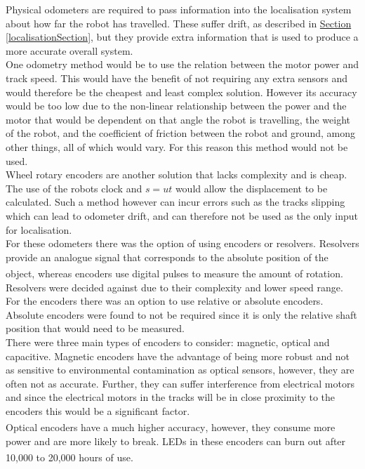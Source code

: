\documentclass[11pt]{article}		%
\newcommand{\supercite}[1]{\textsuperscript{\cite{#1}}}		%
\newcommand{\sectref}[1]{\hyperref[#1]{Section \ref*{#1}}}     %
\begin{document}
	        Physical odometers are required to pass information into the localisation system about how far the robot has travelled.
	        These suffer drift, as described in \sectref{localisationSection}, but they provide extra information that is used to produce a more accurate overall system.
	        \\
	        One odometry method would be to use the relation between the motor power and track speed.
	        This would have the benefit of not requiring any extra sensors and would therefore be the cheapest and least complex solution.
	        However its accuracy would be too low due to the non-linear relationship between the power and the motor that would be dependent on that angle the robot is travelling, the weight of the robot, and the coefficient of friction between the robot and ground, among other things, all of which would vary.
	        For this reason this method would not be used.
	        \\
	        Wheel rotary encoders are another solution that lacks complexity and is cheap.
	        The use of the robots clock and $s=ut$ would allow the displacement to be calculated. 
	        Such a method however can incur errors such as the tracks slipping which can lead to odometer drift, and can therefore not be used as the only input for localisation.
	        \\
	        For these odometers there was the option of using encoders or resolvers. Resolvers provide an analogue signal that corresponds to the absolute position of the object, whereas encoders use digital pulses to measure the amount of rotation.\supercite{Encoder_resolver}
	        Resolvers were decided against due to their complexity and lower speed range.
	        For the encoders there was an option to use relative or absolute encoders. 
	        Absolute encoders were found to not be required since it is only the relative shaft position that would need to be measured.
	        \\
	        There were three main types of encoders to consider: magnetic, optical and capacitive.
	        Magnetic encoders have the advantage of being more robust and not as sensitive to environmental contamination as optical sensors, however, they are often not as accurate. 
	        Further, they can suffer interference from electrical motors and since the electrical motors in the tracks will be in close proximity to the encoders this would be a significant factor. 
	        \\
	        Optical encoders have a much higher accuracy\supercite{Encoders}, however, they consume more power and are more likely to break. LEDs in these encoders can burn out after 10,000 to 20,000 hours of use.\supercite{Encoders} 
\end{document}
